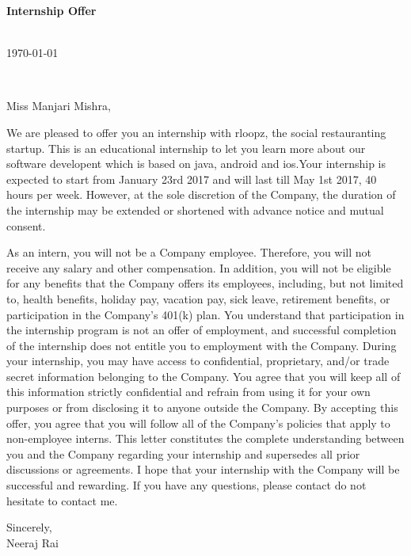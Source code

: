 \documentclass[11pt,a4paper]{letter} %
\def\opening#1{\thispagestyle{empty}
{\centering\fromaddress \vspace{0.6in} \\ %
\hspace*{\longindentation}\today\hspace*{\fill}\par} %
{\raggedright \toname \\ \toaddress \par} %
\vspace{0.4in} %
\noindent #1 %
}
\begin{document}

\begin{letter}
{\textbf{Internship Offer}\\
}


\opening{}

Miss Manjari Mishra,

We are pleased to offer you an internship with  rloopz, the social restauranting startup. This is an educational internship to let you learn more about our software developent which is based on java, android and ios.Your internship  is  expected  to start from January 23rd 2017  and will last  till  May 1st  2017, 40 hours per week.  However, at the sole discretion of the Company, the duration of the internship may be extended or shortened with advance  notice and mutual consent.


As an intern, you will not be a Company employee. Therefore, you will not receive any salary and other compensation. In addition, you will not be eligible for any benefits that the Company offers its employees, including, but not limited to, health  benefits, holiday pay, vacation pay, sick leave, retirement benefits, or participation in the Company's 401(k) plan. You understand that participation in the internship program is not an offer of employment, and successful completion of the internship does not entitle you to employment with the Company.  
During your internship, you may have access to confidential, proprietary, and/or trade secret information belonging to the Company. You agree that you will keep all of this information strictly confidential and refrain from using it for your own purposes or from disclosing it to anyone outside the Company. 
By accepting this offer, you agree that you will follow all of the Company's policies that apply to non-employee interns. This letter constitutes the complete understanding between you and the Company regarding your internship and supersedes all prior discussions or agreements. I hope that your internship with the Company will be successful and rewarding. If you have any questions, please contact do not hesitate to contact me.     

{Sincerely,\\
     Neeraj Rai}


\end{letter}
\end{document}
